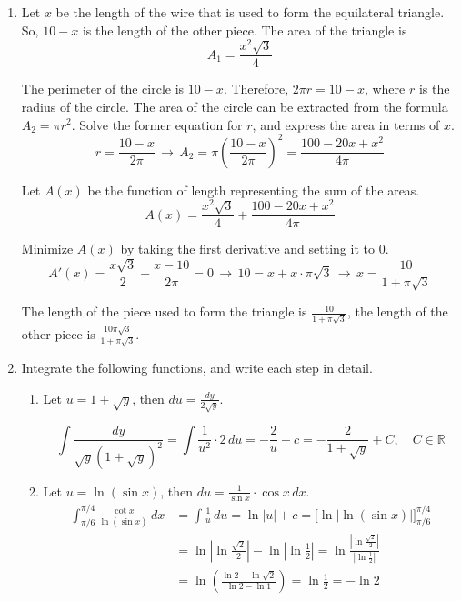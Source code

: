 \documentclass[a4paper, 12pt]{article}
\begin{document}

\begin{enumerate}[leftmargin=*,label=\textbf{\arabic*.}]

\item Let $x$ be the length of the wire that is used to form the equilateral triangle. So, $10-x$ is the length of the other piece. The area of the triangle is
\[A_1 = \frac{x^2\sqrt3}{4}\]

The perimeter of the circle is $10-x$. Therefore, $2\pi r = 10-x$, where $r$ is the radius of the circle. The area of the circle can be extracted from the formula $A_2=\pi r^2$. Solve the former equation for $r$, and express the area in terms of $x$.
\[r=\frac{10-x}{2\pi}\,\rightarrow\, A_2 = \pi\left(\frac{10-x}{2\pi}\right)^2 =\frac{100-20x+x^2}{4\pi}\]

Let $A(x)$ be the function of length representing the sum of the areas.
\[A(x) = \frac{x^2\sqrt3}{4}+\frac{100-20x+x^2}{4\pi}\]

Minimize $A(x)$ by taking the first derivative and setting it to $0$.
\[A'(x)=\frac{x\sqrt3}{2} + \frac{x-10}{2\pi}=0\,\rightarrow\,10=x+x\cdot\pi\sqrt3\,\rightarrow\,x=\frac{10}{1+\pi\sqrt3}\]

The length of the piece used to form the triangle is $\displaystyle\frac{10}{1+\pi\sqrt3}$, the length of the other piece is $\displaystyle\frac{10\pi\sqrt3}{1+\pi\sqrt3}$.

\item Integrate the following functions, and write each step in detail.

\begin{enumerate}[leftmargin=*,label=\textbf{\alph*.}]
\item Let $u=1+\sqrt y$, then $\displaystyle du=\frac{dy}{2\sqrt y}$.

\[\int\frac{dy}{\sqrt{y}\left(1+\sqrt y\right)^2}=\int\frac{1}{u^2}\cdot2\,du=-\frac{2}{u}+c=\boxed{-\frac{2}{1+\sqrt y}+C,\quad C\in\mathbb{R}}\]

\item Let $u=\ln(\sin x)$, then $\displaystyle du=\frac{1}{\sin x}\cdot \cos x\,dx$.
\begin{align*}
\int_{\pi/6}^{\pi/4}\frac{\cot x}{\ln(\sin x)}\,dx&=\int\frac1u\,du=\ln|u| + c=\Big[\ln\left|\ln(\sin x)\right| \Big]_{\pi/6}^{\pi/4}\\[1em]&=\ln\left|\ln\frac{\sqrt2}2\right|-\ln\left|\ln\frac12\right|=\ln\frac{\left|\ln\frac{\sqrt2}{2}\right|}{\left|\ln\frac12\right|}\\[1em]&=\ln\left(\frac{\ln2-\ln\sqrt2}{\ln2-\ln1}\right)=\ln\frac12=\boxed{-\ln2}
\end{align*}


\end{enumerate}
\end{enumerate}
\end{document}
